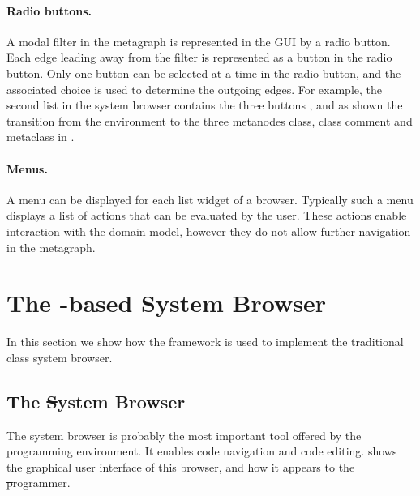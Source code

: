 \documentclass[a4paper,10pt,twoside]{book}
\begin{document}
\paragraph{Radio buttons.} A modal filter in the metagraph is represented in the GUI by a radio button. Each edge leading away from the filter is represented as a button in the radio button. Only one button can be selected at a time in the radio button, and the associated choice is used to determine the outgoing edges. For example, the second list in the system browser contains the three buttons ,  and  as shown the transition from the environment to the three metanodes class, class comment and metaclass in .

\paragraph{Menus.} A menu can be displayed for each list widget of a browser. Typically such a menu displays a list of actions that can be evaluated by the user. These actions enable interaction with the domain model, however they do not allow further navigation in the metagraph.






\section{The \ob-based System Browser} 

In this section we show how the framework is used to implement the traditional class system browser. 

\subsection{The \st System Browser}
The system browser is probably the most important tool offered by the \pharo programming environment. It enables code navigation and code editing.  shows the graphical user interface of this browser, and how it appears to the \st programmer. 
\end{document}
